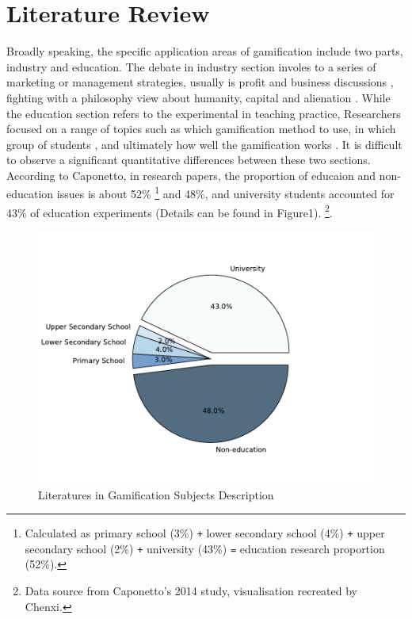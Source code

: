 \documentclass[12pt]{article} %
\begin{document}
\newpage

\section*{Literature Review}

\vspace{.5cm}

\noindent Broadly speaking, the specific application areas of gamification include two parts, industry and education. The debate in industry section involes to a series of marketing or management strategies, usually is profit and business discussions \citep{huotari2017definition, noorbehbahani2019systematic}, fighting with a philosophy view about humanity, capital and alienation \citep{woodcock2018gamification}. While the education section refers to the experimental in teaching practice, Researchers focused on a range of topics such as which gamification method to use, in which group of students \citep{kocakoyun2018review}, and ultimately how well the gamification works \citep{toda2017dark, alsawaier2018effect}. It is difficult to observe a significant quantitative differences between these two sections. According to Caponetto, \citep{caponetto2014gamification} in research papers, the proportion of educaion and non-education issues is about 52\% 
\footnote[2]{
	Calculated as primary school (3\%) \texttt{+} lower secondary school (4\%) \texttt{+} upper secondary school (2\%) \texttt{+} university (43\%) \texttt{=} education research proportion (52\%).
}
and 48\%, and university students accounted for 43\% of education experiments (Details can be found in Figure1).
\footnote[3]{
	Data source from Caponetto's 2014 study, visualisation recreated by Chenxi.
}.
\begin{figure}[h]
	\centering
	\caption{Literatures in Gamification Subjects Description}
	\includegraphics[width=.7\textwidth]
	{literature_statistics.pdf}  
\end{figure}
\end{document}

